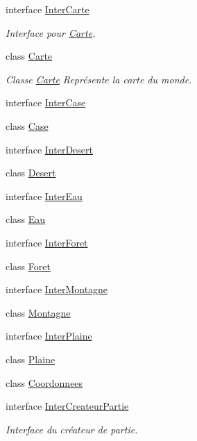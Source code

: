 \begin{DoxyCompactItemize}
\item 
interface \hyperlink{interface_small_world_1_1_inter_carte}{Inter\-Carte}
\begin{DoxyCompactList}\small\item\em Interface pour \hyperlink{class_small_world_1_1_carte}{Carte}. \end{DoxyCompactList}\item 
class \hyperlink{class_small_world_1_1_carte}{Carte}
\begin{DoxyCompactList}\small\item\em Classe \hyperlink{class_small_world_1_1_carte}{Carte} Représente la carte du monde. \end{DoxyCompactList}\item 
interface \hyperlink{interface_small_world_1_1_inter_case}{Inter\-Case}
\item 
class \hyperlink{class_small_world_1_1_case}{Case}
\item 
interface \hyperlink{interface_small_world_1_1_inter_desert}{Inter\-Desert}
\item 
class \hyperlink{class_small_world_1_1_desert}{Desert}
\item 
interface \hyperlink{interface_small_world_1_1_inter_eau}{Inter\-Eau}
\item 
class \hyperlink{class_small_world_1_1_eau}{Eau}
\item 
interface \hyperlink{interface_small_world_1_1_inter_foret}{Inter\-Foret}
\item 
class \hyperlink{class_small_world_1_1_foret}{Foret}
\item 
interface \hyperlink{interface_small_world_1_1_inter_montagne}{Inter\-Montagne}
\item 
class \hyperlink{class_small_world_1_1_montagne}{Montagne}
\item 
interface \hyperlink{interface_small_world_1_1_inter_plaine}{Inter\-Plaine}
\item 
class \hyperlink{class_small_world_1_1_plaine}{Plaine}
\item 
class \hyperlink{class_small_world_1_1_coordonnees}{Coordonnees}
\item 
interface \hyperlink{interface_small_world_1_1_inter_createur_partie}{Inter\-Createur\-Partie}
\begin{DoxyCompactList}\small\item\em Interface du créateur de partie. \end{DoxyCompactList}\item 

\end{DoxyCompactItemize}
